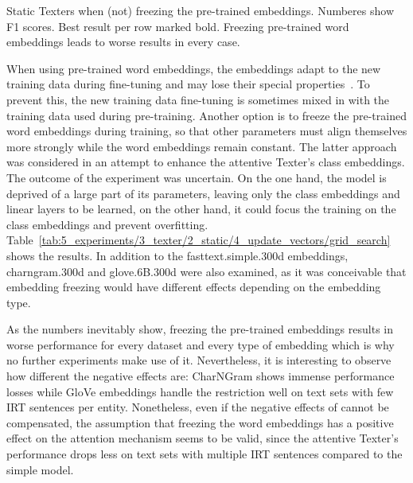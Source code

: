 \begin{table}
    \centering
    
    \caption{Static Texters when (not) freezing the pre-trained embeddings. Numberes show F1 scores. Best result per row marked bold. Freezing pre-trained word embeddings leads to worse results in every case.}
    \label{tab:5_experiments/3_texter/2_static/4_update_vectors/grid_search}
\end{table}

When using pre-trained word embeddings, the embeddings adapt to the new training data during fine-tuning and may lose their special properties~\cite{He2019AnalyzingTF}. To prevent this, the new training data fine-tuning is sometimes mixed in with the training data used during pre-training. Another option is to freeze the pre-trained word embeddings during training, so that other parameters must align themselves more strongly while the word embeddings remain constant. The latter approach was considered in an attempt to enhance the attentive Texter's class embeddings. The outcome of the experiment was uncertain. On the one hand, the model is deprived of a large part of its parameters, leaving only the class embeddings and linear layers to be learned, on the other hand, it could focus the training on the class embeddings and prevent overfitting. Table~\ref{tab:5_experiments/3_texter/2_static/4_update_vectors/grid_search} shows the results. In addition to the fasttext.simple.300d embeddings, charngram.300d and glove.6B.300d were also examined, as it was conceivable that embedding freezing would have different effects depending on the embedding type.

As the numbers inevitably show, freezing the pre-trained embeddings results in worse performance for every dataset and every type of embedding which is why no further experiments make use of it. Nevertheless, it is interesting to observe how different the negative effects are: CharNGram shows immense performance losses while GloVe embeddings handle the restriction well on text sets with few IRT sentences per entity. Nonetheless, even if the negative effects of cannot be compensated, the assumption that freezing the word embeddings has a positive effect on the attention mechanism seems to be valid, since the attentive Texter's performance drops less on text sets with multiple IRT sentences compared to the simple model.
